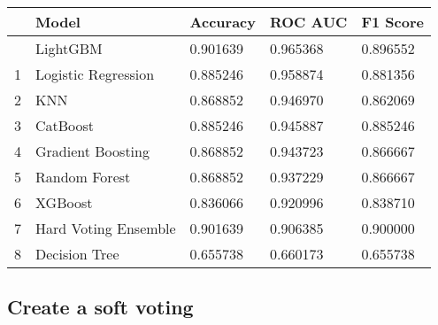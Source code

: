 \documentclass[
  letterpaper,
  DIV=11,
  numbers=noendperiod]{scrreprt}
\begin{document}
\begin{longtable}[]{@{}lllll@{}}
\toprule\noalign{}
& Model & Accuracy & ROC AUC & F1 Score \\
\midrule\noalign{}
\endhead
\bottomrule\noalign{}
\endlastfoot
0 & LightGBM & 0.901639 & 0.965368 & 0.896552 \\
1 & Logistic Regression & 0.885246 & 0.958874 & 0.881356 \\
2 & KNN & 0.868852 & 0.946970 & 0.862069 \\
3 & CatBoost & 0.885246 & 0.945887 & 0.885246 \\
4 & Gradient Boosting & 0.868852 & 0.943723 & 0.866667 \\
5 & Random Forest & 0.868852 & 0.937229 & 0.866667 \\
6 & XGBoost & 0.836066 & 0.920996 & 0.838710 \\
7 & Hard Voting Ensemble & 0.901639 & 0.906385 & 0.900000 \\
8 & Decision Tree & 0.655738 & 0.660173 & 0.655738 \\
\end{longtable}

\subsection{Create a soft voting}\label{create-a-soft-voting}
\end{document}
